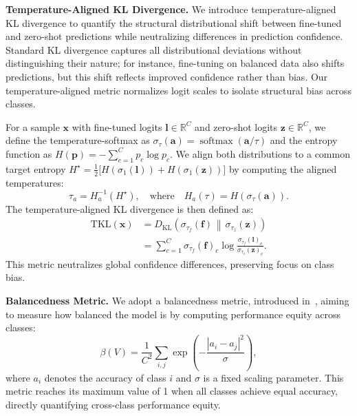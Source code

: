 \documentclass[10pt,twocolumn,letterpaper]{article}
\begin{document}
\noindent\textbf{Temperature-Aligned KL Divergence.} 
We introduce temperature-aligned KL divergence to quantify the structural distributional shift between fine-tuned and zero-shot predictions while neutralizing differences in prediction confidence. Standard KL divergence captures all distributional deviations without distinguishing their nature; for instance, fine-tuning on balanced data also shifts predictions, but this shift reflects improved confidence rather than bias. Our temperature-aligned metric normalizes logit scales to isolate structural bias across classes.

For a sample $\mathbf{x}$ with fine-tuned logits $\mathbf{l} \in \mathbb{R}^C$ and zero-shot logits $\mathbf{z} \in \mathbb{R}^C$, we define the temperature-softmax as $\sigma_{\tau}(\mathbf{a})=\operatorname{softmax}(\mathbf{a}/\tau)$ and the entropy function as $H(\mathbf{p})=-\sum_{c=1}^{C} p_c \log p_c$. We align both distributions to a common target entropy $H^\star = \tfrac{1}{2}\big[ H(\sigma_{1}(\mathbf{l})) + H(\sigma_{1}(\mathbf{z})) \big]$ by computing the aligned temperatures:
\begin{equation}
\tau_{a} = H_{a}^{-1}(H^\star), \quad \text{where} \quad H_{a}(\tau) = H(\sigma_\tau(\mathbf{a})).
\end{equation}
The temperature-aligned KL divergence is then defined as:
\begin{equation}
\begin{aligned}
\mathrm{TKL}(\mathbf{x})
&= D_{\mathrm{KL}}\!\left(\sigma_{\tau_{f}}(\mathbf{f}) \,\middle\Vert\, \sigma_{\tau_{z}}(\mathbf{z})\right) \\
&= \sum_{c=1}^{C} \sigma_{\tau_{f}}(\mathbf{f})_c
   \log \frac{\sigma_{\tau_{f}}(\mathbf{l})_c}{\sigma_{\tau_{z}}(\mathbf{z})_c}.
\end{aligned}
\end{equation}
This metric neutralizes global confidence differences, preserving focus on class bias.


\noindent\textbf{Balancedness Metric.}
We adopt a balancedness metric, introduced in~\cite{kang2020exploring}, aiming to measure how balanced the model is by computing performance equity across classes:
\begin{equation}
    \beta(V) = \frac{1}{C^2} \sum_{i,j} \exp\left(-\frac{|a_i - a_j|^2}{\sigma}\right),
\end{equation}
where $a_i$ denotes the accuracy of class $i$ and $\sigma$ is a fixed scaling parameter. This metric reaches its maximum value of 1 when all classes achieve equal accuracy, directly quantifying cross-class performance equity.
\end{document}
